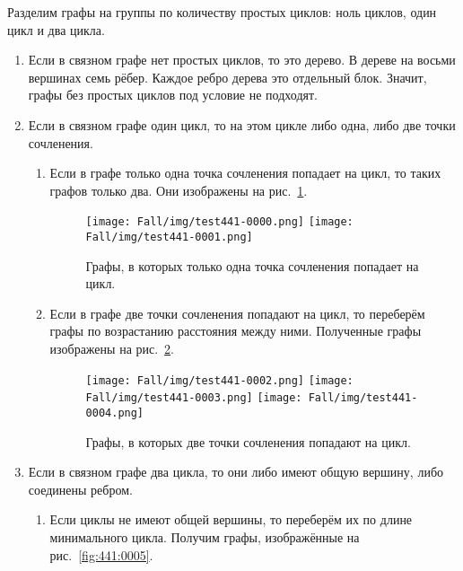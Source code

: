 \begin{solution}
Разделим графы на группы по количеству простых циклов: ноль циклов, один цикл и два цикла.
\begin{enumerate}

\item Если в связном графе нет простых циклов, то это дерево. В дереве на восьми вершинах семь рёбер. Каждое ребро дерева это отдельный блок. Значит, графы без простых циклов под условие не подходят.

\item 
Если в связном графе один цикл, то на этом цикле либо одна, либо две точки сочленения.
\begin{enumerate}

\item 
Если в графе только одна точка сочленения попадает на цикл, то таких графов только два. Они изображены на рис.~\ref{fig:441:0000}.

\begin{figure}[H]
    \centering
    \texttt{[image: Fall/img/test441-0000.png]}
    \texttt{[image: Fall/img/test441-0001.png]}
    \caption{Графы, в которых только одна точка сочленения попадает на цикл.}
    \label{fig:441:0000}
\end{figure}

\item 
Если в графе две точки сочленения попадают на цикл, то переберём графы по возрастанию расстояния между ними. Полученные графы изображены на рис.~\ref{fig:441:0002}.

\begin{figure}[H]
    \centering
    \texttt{[image: Fall/img/test441-0002.png]}
    \texttt{[image: Fall/img/test441-0003.png]}
    \texttt{[image: Fall/img/test441-0004.png]}
    \caption{Графы, в которых две точки сочленения попадают на цикл.}
    \label{fig:441:0002}
\end{figure}

\end{enumerate}

\item 
Если в связном графе два цикла, то они либо имеют общую вершину, либо соединены ребром.
\begin{enumerate}

\item 
Если циклы не имеют общей вершины, то переберём их по длине минимального цикла. Получим графы, изображённые на рис.~\ref{fig:441:0005}.


\end{enumerate}
\end{enumerate}
\end{solution}
